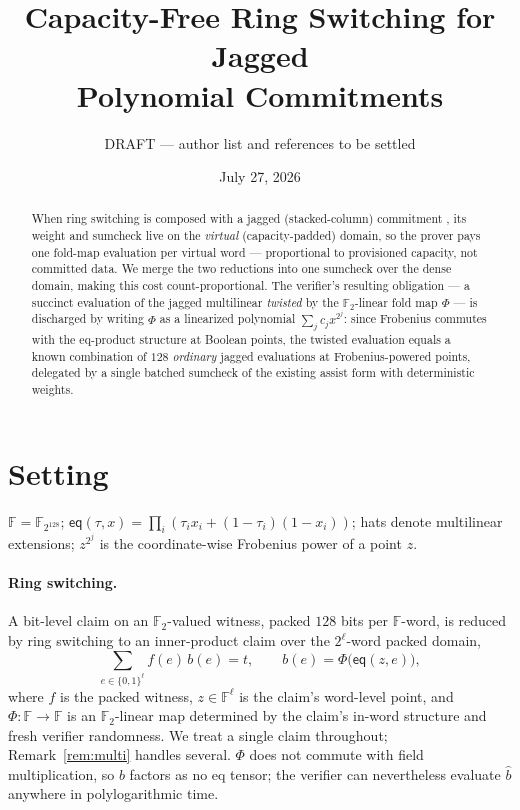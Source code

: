 \documentclass[11pt]{article}
\title{Capacity-Free Ring Switching for Jagged\\ Polynomial Commitments}
\author{DRAFT --- author list and references to be settled}
\date{July 27, 2026}
\newcommand{\F}{\mathbb{F}}
\newcommand{\Ftwo}{\F_2}
\newcommand{\eq}{\mathsf{eq}}
\begin{document}
\maketitle

\begin{abstract}
When ring switching \cite{dp-ringswitch} is composed with a jagged
(stacked-column) commitment \cite{jagged}, its weight and sumcheck live
on the \emph{virtual} (capacity-padded) domain, so the prover pays one
fold-map evaluation per virtual word --- proportional to provisioned
capacity, not committed data. We merge the two reductions into one
sumcheck over the dense domain, making this cost count-proportional.
The verifier's resulting obligation --- a succinct evaluation of the
jagged multilinear \emph{twisted} by the $\Ftwo$-linear fold map $\Phi$
--- is discharged by writing $\Phi$ as a linearized polynomial
$\sum_j c_j x^{2^j}$: since Frobenius commutes with the eq-product
structure at Boolean points, the twisted evaluation equals a known
combination of $128$ \emph{ordinary} jagged evaluations at
Frobenius-powered points, delegated by a single batched sumcheck of the
existing assist form with deterministic weights.
\end{abstract}

\section{Setting}\label{sec:setting}

$\F = \F_{2^{128}}$; $\eq(\tau, x) = \prod_i (\tau_i x_i +
(1{-}\tau_i)(1{-}x_i))$; hats denote multilinear extensions; $z^{2^j}$
is the coordinate-wise Frobenius power of a point $z$.

\paragraph{Ring switching.} A bit-level claim on an $\Ftwo$-valued
witness, packed $128$ bits per $\F$-word, is reduced by ring switching
to an inner-product claim over the $2^{\ell}$-word packed domain,
\begin{equation}\label{eq:rs}
  \textstyle\sum_{e \in \{0,1\}^{\ell}} f(e)\, b(e) = t,
  \qquad
  b(e) = \Phi\bigl(\eq(z, e)\bigr),
\end{equation}
where $f$ is the packed witness, $z \in \F^{\ell}$ is the claim's
word-level point, and $\Phi : \F \to \F$ is an $\Ftwo$-linear map
determined by the claim's in-word structure and fresh verifier
randomness. We treat a single claim throughout;
Remark~\ref{rem:multi} handles several. $\Phi$ does not commute with
field multiplication, so $b$ factors as no eq tensor; the verifier can
nevertheless evaluate $\hat b$ anywhere in polylogarithmic time.
\end{document}
